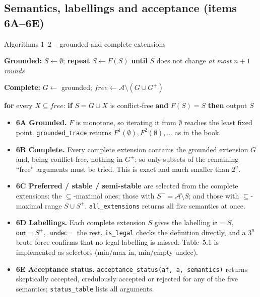 \documentclass[10pt,a4paper]{article}
\newcommand{\code}[1]{\textcolor{brand!85!black}{\texttt{#1}}}
\newcommand{\kw}[1]{\textsf{\bfseries\color{brand}#1}}
\newcommand{\Args}{\mathcal{A}}
\newcommand{\ind}{\hspace*{1.2em}}
\newcommand{\cmt}[1]{\hfill{\color{muted}\small\itshape #1}}
\begin{document}
\subsection{Semantics, labellings and acceptance (items 6A--6E)}\label{sec:semantics}

\begin{algobox}{Algorithms 1--2 -- grounded and complete extensions}
\begin{algo}
  \item \kw{Grounded:} $S\gets\emptyset$; \kw{repeat} $S\gets F(S)$ \kw{until} $S$ does not change \cmt{at most $n+1$ rounds}
  \item \kw{Complete:} $G\gets$ grounded; $\mathit{free}\gets\Args\setminus(G\cup G^+)$
  \item \ind \kw{for} every $X\subseteq\mathit{free}$: \kw{if} $S=G\cup X$ is conflict-free \kw{and} $F(S)=S$ \kw{then} output $S$
\end{algo}
\end{algobox}

\begin{itemize}
  \item \textbf{6A Grounded.} $F$ is monotone, so iterating it from $\emptyset$ reaches the least fixed point.
        \code{grounded\_trace} returns $F^1(\emptyset), F^2(\emptyset), \dots$ as in the book.
  \item \textbf{6B Complete.} Every complete extension contains the grounded extension $G$ and, being conflict-free, nothing in
        $G^+$; so only subsets of the remaining ``free'' arguments must be tried. This is exact and much smaller than $2^n$.
  \item \textbf{6C Preferred / stable / semi-stable} are selected from the complete extensions: the $\subseteq$-maximal ones; those
        with $S^+=\Args\setminus S$; and those with $\subseteq$-maximal range $S\cup S^+$. \code{all\_extensions} returns all five
        semantics at once.
  \item \textbf{6D Labellings.} Each complete extension $S$ gives the labelling $\textsf{in}=S$, $\textsf{out}=S^+$,
        $\textsf{undec}=$ the rest. \code{is\_legal} checks the definition directly, and a $3^n$ brute force confirms that no
        legal labelling is missed. Table~5.1 is implemented as selectors (min/max \textsf{in}, min/empty \textsf{undec}).
  \item \textbf{6E Acceptance status.} \code{acceptance\_status(af, a, semantics)} returns skeptically accepted, credulously
        accepted or rejected for any of the five semantics; \code{status\_table} lists all arguments.
\end{itemize}
\end{document}
